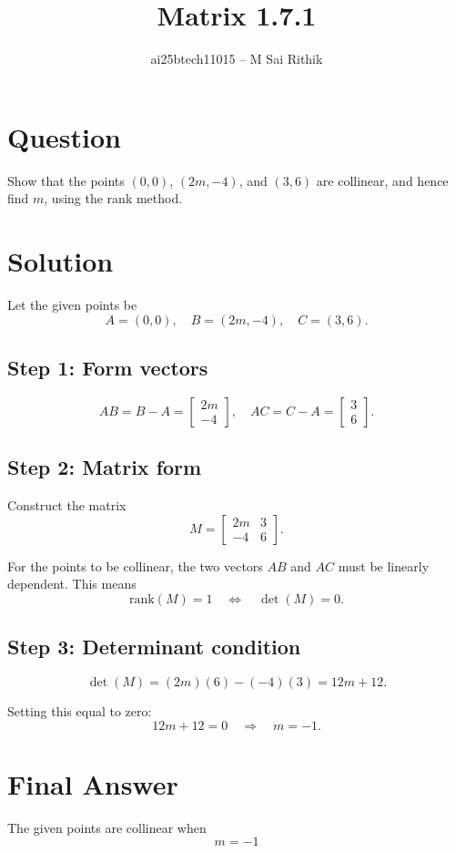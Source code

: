 \documentclass[12pt]{article}
\title{Matrix 1.7.1}
\author{ai25btech11015 -- M Sai Rithik}
\date{}
\begin{document}
\maketitle

\section*{Question}
Show that the points \((0,0)\), \((2m,-4)\), and \((3,6)\) are collinear, and hence find \(m\), using the rank method.

\section*{Solution}

Let the given points be
\[
A = (0,0), \quad B = (2m,-4), \quad C = (3,6).
\]

\subsection*{Step 1: Form vectors}
\[
AB = B - A = \begin{bmatrix} 2m \\ -4 \end{bmatrix}, 
\quad AC = C - A = \begin{bmatrix} 3 \\ 6 \end{bmatrix}.
\]

\subsection*{Step 2: Matrix form}
Construct the matrix
\[
M = \begin{bmatrix}
2m & 3 \\
-4 & 6
\end{bmatrix}.
\]

For the points to be collinear, the two vectors \(AB\) and \(AC\) must be linearly dependent.  
This means
\[
\text{rank}(M) = 1 \quad \Leftrightarrow \quad \det(M) = 0.
\]

\subsection*{Step 3: Determinant condition}
\[
\det(M) = (2m)(6) - (-4)(3) = 12m + 12.
\]

Setting this equal to zero:
\[
12m + 12 = 0 \quad \Rightarrow \quad m = -1.
\]

\section*{Final Answer}
The given points are collinear when
\[
\boxed{m = -1}
\]
\end{document}
